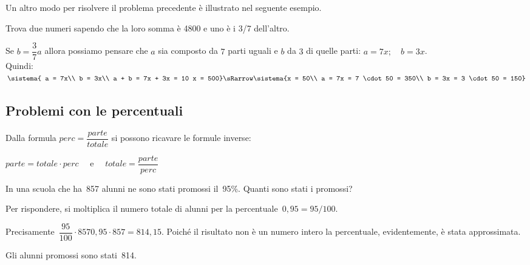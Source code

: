 Un altro modo per risolvere il problema precedente è illustrato nel 
seguente esempio.

\begin{esempio}{}{}
Trova due numeri sapendo che la loro somma è 4800 e uno è i 3/7 dell'altro.

\vspace{.5em}
\vspace{.5em}
Se \(b = \dfrac{3}{7} a\) allora possiamo pensare che \(a\) sia composto 
da \(7\) parti uguali e \(b\) da \(3\) di quelle parti: 
\(a = 7x; \quad b = 3x\). \\
Quindi:
\(\sistema{
a = 7x\\
b = 3x\\
a + b = 7x + 3x = 10 x = 500} \sRarrow 
\sistema{x = 50\\
a = 7x = 7 \cdot 50 = 350\\
b = 3x = 3 \cdot 50 = 150}\)
\end{esempio}

\subsection{Problemi con le percentuali}

Dalla formula \quad \(perc = \dfrac{parte}{totale}\) \quad 
si possono ricavare le formule inverse: 

\hspace*{25mm}
\(parte = totale \cdot perc \quad \text{ e } \quad 
  totale = \dfrac{parte}{perc}\)


\begin{esempio}{}{}
In una scuola che ha~857 alunni ne sono stati promossi il~95\%. 
Quanti sono stati i promossi?

Per rispondere, si moltiplica il numero totale di alunni per la 
percentuale~\(0,95 = 95/100\).

Precisamente~\(\dfrac{95}{100} \cdot 857 0,95 \cdot 857 = 814,15\).
Poiché il risultato non è un numero intero la percentuale, evidentemente, 
è stata approssimata. 

Gli alunni promossi sono stati~814.
 \end{esempio}

